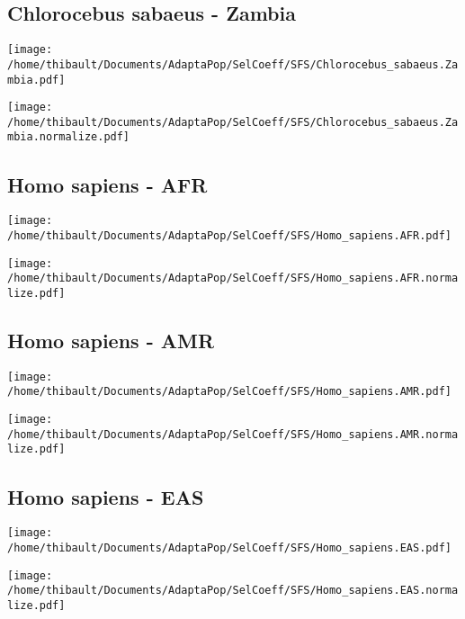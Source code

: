 \subsection{Chlorocebus sabaeus - Zambia} 
 
\begin{minipage}{0.49\linewidth} 
\texttt{[image: /home/thibault/Documents/AdaptaPop/SelCoeff/SFS/Chlorocebus\_sabaeus.Zambia.pdf]} 
\end{minipage}
\begin{minipage}{0.49\linewidth}
\texttt{[image: /home/thibault/Documents/AdaptaPop/SelCoeff/SFS/Chlorocebus\_sabaeus.Zambia.normalize.pdf]} 
\end{minipage}
\subsection{Homo sapiens - AFR} 
 
\begin{minipage}{0.49\linewidth} 
\texttt{[image: /home/thibault/Documents/AdaptaPop/SelCoeff/SFS/Homo\_sapiens.AFR.pdf]} 
\end{minipage}
\begin{minipage}{0.49\linewidth}
\texttt{[image: /home/thibault/Documents/AdaptaPop/SelCoeff/SFS/Homo\_sapiens.AFR.normalize.pdf]} 
\end{minipage}
\subsection{Homo sapiens - AMR} 
 
\begin{minipage}{0.49\linewidth} 
\texttt{[image: /home/thibault/Documents/AdaptaPop/SelCoeff/SFS/Homo\_sapiens.AMR.pdf]} 
\end{minipage}
\begin{minipage}{0.49\linewidth}
\texttt{[image: /home/thibault/Documents/AdaptaPop/SelCoeff/SFS/Homo\_sapiens.AMR.normalize.pdf]} 
\end{minipage}
\subsection{Homo sapiens - EAS} 
 
\begin{minipage}{0.49\linewidth} 
\texttt{[image: /home/thibault/Documents/AdaptaPop/SelCoeff/SFS/Homo\_sapiens.EAS.pdf]} 
\end{minipage}
\begin{minipage}{0.49\linewidth}
\texttt{[image: /home/thibault/Documents/AdaptaPop/SelCoeff/SFS/Homo\_sapiens.EAS.normalize.pdf]} 
\end{minipage}
